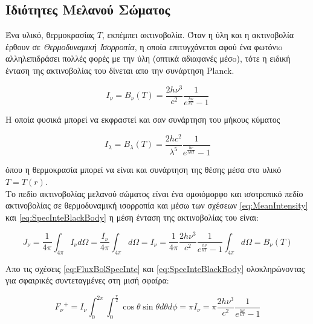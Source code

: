 \subsection{Ιδιότητες Μελανού Σώματος}

Ένα υλικό, θερμοκρασίας $T$, εκπέμπει ακτινοβολία. Όταν η ύλη και η ακτινοβολία έρθουν σε {\it Θερμοδυναμική Ισορροπία}, η οποία επιτυγχάνεται αφού ένα φωτόνιo αλληλεπιδράσει πολλές φορές με την ύλη (οπτικά αδιαφανές μέσo), τότε η ειδική ένταση της ακτινοβολίας του δίνεται απο την συνάρτηση {\en Planck}.  

\begin{equation}\label{eq:SpecInteBlackBody}
  I_{\nu} = B_{\nu}(T) = \frac{2h{\nu}^3}{c^2} \frac{1}{e^{\frac{h\nu}{kT}}-1}
\end{equation}

H οποία φυσικά μπορεί να εκφραστεί και σαν συνάρτηση του μήκους κύματος

\begin{equation}\label{eq:SpecInteBlackBody2}
  I_{\lambda} = B_{\lambda}(T) = \frac{2hc^2}{\lambda^5} \frac{1}{e^{\frac{hc}{\lambda kT}}-1}
\end{equation}

όπου η θερμοκρασία μπορεί να είναι και συνάρτηση της θέσης μέσα στο υλικό $Τ=Τ(r)$.\\

Το πεδίο ακτινοβολίας μελανού σώματος είναι ένα ομοιόμορφο και ισοτροπικό πεδίο ακτινοβολίας σε θερμοδυναμική ισορροπία και μέσω των σχέσεων \eqref{eq:MeanIntensity} και \eqref{eq:SpecInteBlackBody} η μέση ένταση της ακτινοβολίας του είναι:

\begin{equation}\label{eq:MeanInteBlackBody1}
  J_{\nu} = \frac{1}{4\pi}\int_{4\pi} I_{\nu} d\Omega = \frac{I_{\nu}}{4\pi}\int_{4\pi} d\Omega = I_{\nu} = \frac{1}{4\pi} \frac{2h{\nu}^3}{c^2} \frac{1}{e^{\frac{h\nu}{kT}}-1} \int_{4\pi} d\Omega = B_{\nu}(T)
\end{equation}

Απο τις σχέσεις \eqref{eq:FluxBolSpecInte} και \eqref{eq:SpecInteBlackBody} ολοκληρώνοντας για σφαιρικές συντεταγμένες στη μισή σφαίρα:

\begin{equation}\label{eq:PossitiveFlux}
  {F_{\nu}}^{+} = I_{\nu}\int_{0}^{2\pi} \int_{0}^{\frac{\pi}{2}} \cos{\theta} \sin{\theta}  d\theta d\phi = \pi I_{\nu} =  \pi \frac{2h{\nu}^3}{c^2} \frac{1}{e^{\frac{h\nu}{kT}}-1}
\end{equation}

